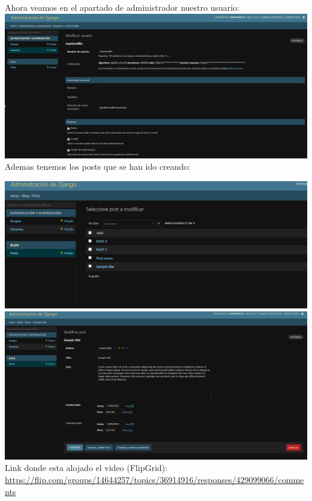 \documentclass{article}
\begin{document}
        \newline\newline\newline
        Ahora veamos en el apartado de administrador nuestro usuario:
        \newline\newline
        \includegraphics[width=16cm]{img/USUARIO.png}
        Ademas tenemos los posts que se han ido creando:\newline
    
        \includegraphics[width=16cm]{img/LISTADOposts.png}
        \newline\newline
        \includegraphics[width=16cm]{img/POSTejemplo.png}
        \newline
        Link donde esta alojado el video (FlipGrid): \url{https://flip.com/groups/14644257/topics/36914916/responses/429099066/comments}
        
\end{document}
